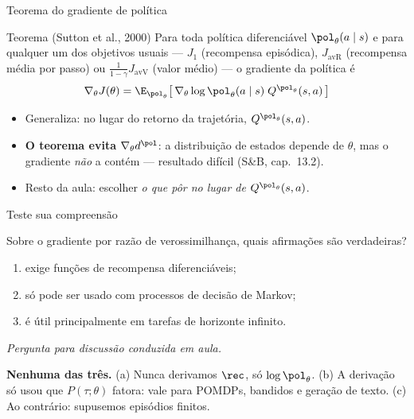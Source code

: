 \documentclass[aspectratio=169, 11pt]{beamer}
\newcommand{\paradiscussao}{\smallskip
  {\footnotesize\color{rlCinza}\itshape Pergunta para discussão conduzida em aula.}}
\newcommand{\thv}{\theta}                       %
\newcommand{\polth}{\pol_{\thv}}                %
\newcommand{\gth}{\nabla_{\thv}}                %
\newcommand{\traj}{\tau}                        %
\newcommand{\Ptraj}{P(\traj;\thv)}
\newcommand{\gscore}{\gth \log \polth(a \mid s)} %
\begin{document}
\begin{frame}{Teorema do gradiente de política}

  \begin{teobox}{Teorema \textnormal{(Sutton et al., 2000)}}
    Para toda política diferenciável $\polth(a\mid s)$ e para qualquer um dos
    objetivos usuais --- $J_1$ (recompensa episódica), $J_{\text{avR}}$
    (recompensa média por passo) ou $\tfrac{1}{1-\gamma}J_{\text{avV}}$ (valor
    médio) --- o gradiente da política é
    \[
      \gth J(\thv) = \E_{\polth}\bigl[\, \gscore\; Q^{\polth}(s,a) \,\bigr]
    \]
  \end{teobox}

  \begin{itemize}\setlength{\itemsep}{0.35ex}
    \item Generaliza: no lugar do retorno da trajetória, $Q^{\polth}(s,a)$.
    \item \textbf{O teorema evita} $\gth d^{\pol}$: a distribuição de estados
      depende de $\thv$, mas o gradiente \emph{não} a contém --- resultado
      difícil (S\&B, cap.\ 13.2).
    \item Resto da aula: escolher \emph{o que pôr no lugar de $Q^{\polth}(s,a)$}.
  \end{itemize}
\end{frame}

\begin{frame}{Teste sua compreensão}

  \begin{quizbox}{}
    Sobre o gradiente por razão de verossimilhança, quais afirmações são
    verdadeiras?
    \begin{enumerate}\setlength{\itemsep}{0.1ex}
      \item[(a)] exige funções de recompensa diferenciáveis;
      \item[(b)] só pode ser usado com processos de decisão de Markov;
      \item[(c)] é útil principalmente em tarefas de horizonte infinito.
    \end{enumerate}
    \paradiscussao
  \end{quizbox}

  \pause
  \vspace{-0.3em}
  \begin{respbox}
    \textbf{Nenhuma das três.} (a) Nunca derivamos $\rec$, só $\log\polth$.
    (b) A derivação só usou que $\Ptraj$ fatora: vale para POMDPs, bandidos e
    geração de texto. (c) Ao contrário: supusemos episódios finitos.
  \end{respbox}
\end{frame}
\end{document}
